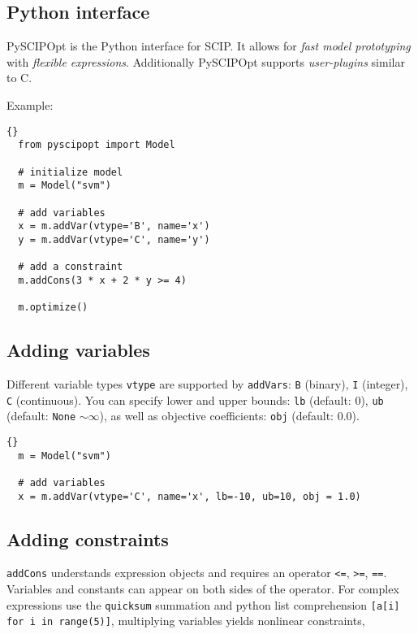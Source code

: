 \documentclass[12pt]{article}
\newcommand\ttt\texttt
\begin{document}
\subsection*{Python interface}

PySCIPOpt is the Python interface for SCIP.
It allows for \emph{fast model prototyping} with \emph{flexible expressions}.
Additionally PySCIPOpt supports \emph{user-plugins} similar to C.

Example:

\begin{lstlisting}[frame=tb]{}
  from pyscipopt import Model

  # initialize model
  m = Model("svm")

  # add variables
  x = m.addVar(vtype='B', name='x')
  y = m.addVar(vtype='C', name='y')

  # add a constraint
  m.addCons(3 * x + 2 * y >= 4)

  m.optimize()
\end{lstlisting}

\subsection*{Adding variables}

Different variable types \ttt{vtype} are supported by \ttt{addVars}: \ttt{B} (binary), \ttt{I} (integer), \ttt{C} (continuous).
You can specify lower and upper bounds: \ttt{lb} (default: 0), \ttt{ub} (default: \ttt{None} $\sim \infty$), as well as objective coefficients: \ttt{obj} (default: $0.0$).


\begin{lstlisting}[frame=tb]{}
  m = Model("svm")

  # add variables
  x = m.addVar(vtype='C', name='x', lb=-10, ub=10, obj = 1.0)
\end{lstlisting}

\subsection*{Adding constraints}

\ttt{addCons} understands expression objects and requires an operator \ttt{<=}, \ttt{>=}, \ttt{==}. Variables and constants can appear on both sides of the operator.
For complex expressions use the \ttt{quicksum} summation and python list comprehension \ttt{[a[i] for i in range(5)]}, multiplying variables yields nonlinear constraints,
\end{document}

